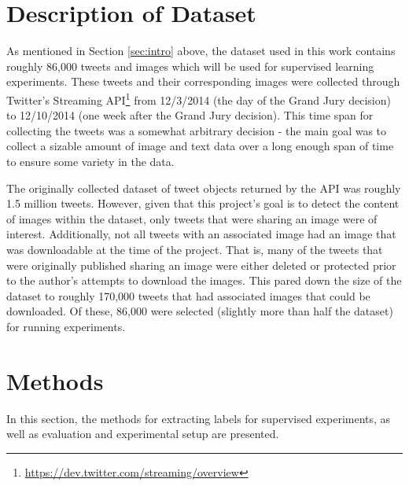 \documentclass[twoside,11pt]{article}
\begin{document}
\section{Description of Dataset}
As mentioned in Section \ref{sec:intro} above, the dataset used in this work contains roughly 86,000 tweets and images which will be used for supervised learning experiments. These tweets and their corresponding images were collected through Twitter's Streaming API\footnote{\url{https://dev.twitter.com/streaming/overview}} from 12/3/2014 (the day of the Grand Jury decision) to 12/10/2014 (one week after the Grand Jury decision). This time span for collecting the tweets was a somewhat arbitrary decision - the main goal was to collect a sizable amount of image and text data over a long enough span of time to ensure some variety in the data.
\par
The originally collected dataset of tweet objects returned by the API was roughly 1.5 million tweets. However, given that this project's goal is to detect the content of images within the dataset, only tweets that were sharing an image were of interest. Additionally, not all tweets with an associated image had an image that was downloadable at the time of the project. That is, many of the tweets that were originally published sharing an image were either deleted or protected prior to the author's attempts to download the images. This pared down the size of the dataset to roughly 170,000 tweets that had associated images that could be downloaded. Of these, 86,000 were selected (slightly more than half the dataset) for running experiments. 

\section{Methods}
In this section, the methods for extracting labels for supervised experiments, as well as evaluation and experimental setup are presented.
\end{document}
